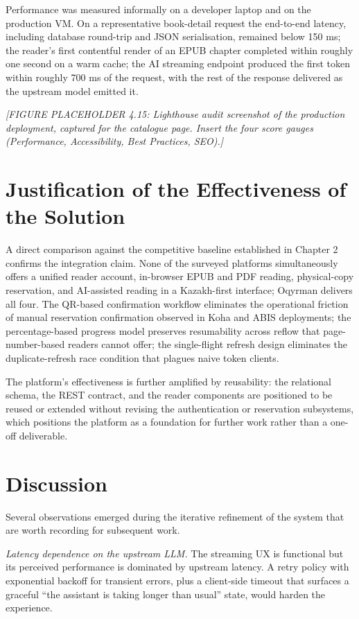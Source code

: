 \documentclass[12pt,a4paper]{report}
\begin{document}
Performance was measured informally on a developer laptop and on the
production VM. On a representative book-detail request the end-to-end
latency, including database round-trip and JSON serialisation,
remained below 150 ms; the reader's first contentful render of an
EPUB chapter completed within roughly one second on a warm cache;
the AI streaming endpoint produced the first token within roughly
700 ms of the request, with the rest of the response delivered as
the upstream model emitted it.

\textit{[FIGURE PLACEHOLDER 4.15: Lighthouse audit screenshot of the
production deployment, captured for the catalogue page. Insert the
four score gauges (Performance, Accessibility, Best Practices, SEO).]}

\section{Justification of the Effectiveness of the Solution}

A direct comparison against the competitive baseline established in
Chapter 2 confirms the integration claim. None of the surveyed
platforms simultaneously offers a unified reader account, in-browser
EPUB and PDF reading, physical-copy reservation, and AI-assisted
reading in a Kazakh-first interface; Oqyrman delivers all four. The
QR-based confirmation workflow eliminates the operational friction of
manual reservation confirmation observed in Koha and ABIS deployments;
the percentage-based progress model preserves resumability across
reflow that page-number-based readers cannot offer; the
single-flight refresh design eliminates the duplicate-refresh race
condition that plagues naive token clients.

The platform's effectiveness is further amplified by reusability: the
relational schema, the REST contract, and the reader components are
positioned to be reused or extended without revising the
authentication or reservation subsystems, which positions the
platform as a foundation for further work rather than a one-off
deliverable.

\section{Discussion}

Several observations emerged during the iterative refinement of the
system that are worth recording for subsequent work.

\textit{Latency dependence on the upstream LLM.} The streaming UX is
functional but its perceived performance is dominated by upstream
latency. A retry policy with exponential backoff for transient
errors, plus a client-side timeout that surfaces a graceful
``the assistant is taking longer than usual'' state, would harden
the experience.
\end{document}
